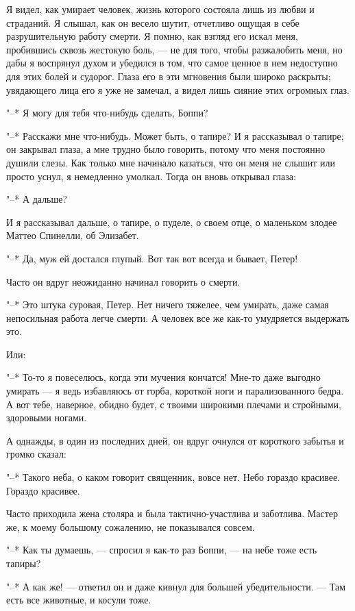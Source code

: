 Я видел, как умирает человек, жизнь  которого состояла лишь из любви и
страданий.  Я слышал,  как он  весело шутит,  отчетливо ощущая  в себе
разрушительную  работу смерти.  Я помню,  как взгляд  его искал  меня,
пробившись сквозь  жестокую боль, ---  не для того,  чтобы разжалобить
меня, но дабы я  воспрянул духом и убедился в том,  что самое ценное в
нем недоступно  для этих болей  и судорог.  Глаза его в  эти мгновения
были широко  раскрыты; увядающего лица его  я уже не замечал,  а видел
лишь сияние этих огромных глаз.

"--* Я могу для тебя что-нибудь сделать, Боппи?

"--* Расскажи мне что-нибудь. Может быть,  о тапире? И я рассказывал о
тапире; он закрывал глаза, а мне трудно было говорить, потому что меня
постоянно душили слезы. Как только  мне начинало казаться, что он меня
не  слышит или  просто уснул,  я  немедленно умолкал.  Тогда он  вновь
открывал глаза:

"--* А дальше?

И я рассказывал дальше, о тапире,  о пуделе, о своем отце, о маленьком
злодее Маттео Спинелли, об Элизабет.

"--* Да, муж ей достался глупый. Вот так вот всегда и бывает, Петер!

Часто он вдруг неожиданно начинал говорить о смерти.

"--* Это штука  суровая, Петер. Нет ничего тяжелее,  чем умирать, даже
самая  непосильная  работа  легче  смерти. А  человек  все  же  как-то
умудряется выдержать это.

Или:

"--*  То-то я  повеселюсь,  когда эти  мучения  кончатся! Мне-то  даже
выгодно  умирать ---  я  ведь  избавляюсь от  горба,  короткой ноги  и
парализованного бедра.  А вот тебе,  наверное, обидно будет,  с твоими
широкими плечами и стройными, здоровыми ногами.

А однажды,  в один из  последних дней,  он вдруг очнулся  от короткого
забытья и громко сказал:

"--* Такого неба,  о каком говорит священник, вовсе  нет. Небо гораздо
красивее. Гораздо красивее.

Часто приходила  жена столяра  и была тактично-участлива  и заботлива.
Мастер же, к моему большому сожалению, не показывался совсем.

"--* Как ты думаешь, --- спросил я  как-то раз Боппи, --- на небе тоже
есть тапиры?

"--*  А   как  же!  ---   ответил  он   и  даже  кивнул   для  большей
убедительности. --- Там есть все животные, и косули тоже.

